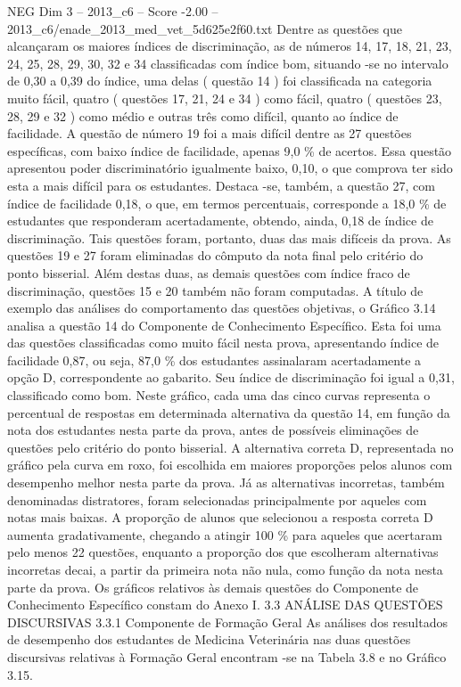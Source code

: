 \begin{textsample}{NEG Dim 3 – 2013\_c6 – Score -2.00 – 2013\_c6/enade\_2013\_med\_vet\_5d625e2f60.txt}
Dentre as questões que alcançaram os maiores índices de discriminação, as de números 14, 17, 18, 21, 23, 24, 25, 28, 29, 30, 32 e 34 classificadas com índice bom, situando -se no intervalo de 0,30 a 0,39 do índice, uma delas ( questão 14 ) foi classificada na categoria muito fácil, quatro ( questões 17, 21, 24 e 34 ) como fácil, quatro ( questões 23, 28, 29 e 32 ) como médio e outras três como difícil, quanto ao índice de facilidade.
A questão de número 19 foi a mais difícil dentre as 27 questões específicas, com baixo índice de facilidade, apenas 9,0 \% de acertos.
Essa questão apresentou poder discriminatório igualmente baixo, 0,10, o que comprova ter sido esta a mais difícil para os estudantes.
Destaca -se, também, a questão 27, com índice de facilidade 0,18, o que, em termos percentuais, corresponde a 18,0 \% de estudantes que responderam acertadamente, obtendo, ainda, 0,18 de índice de discriminação.
Tais questões foram, portanto, duas das mais difíceis da prova.
As questões 19 e 27 foram eliminadas do cômputo da nota final pelo critério do ponto bisserial.
Além destas duas, as demais questões com índice fraco de discriminação, questões 15 e 20 também não foram computadas.
A título de exemplo das análises do comportamento das questões objetivas, o Gráfico 3.14 analisa a questão 14 do Componente de Conhecimento Específico.
Esta foi uma das questões classificadas como muito fácil nesta prova, apresentando índice de facilidade 0,87, ou seja, 87,0 \% dos estudantes assinalaram acertadamente a opção D, correspondente ao gabarito.
Seu índice de discriminação foi igual a 0,31, classificado como bom.
Neste gráfico, cada uma das cinco curvas representa o percentual de respostas em determinada alternativa da questão 14, em função da nota dos estudantes nesta parte da prova, antes de possíveis eliminações de questões pelo critério do ponto bisserial.
A alternativa correta D, representada no gráfico pela curva em roxo, foi escolhida em maiores proporções pelos alunos com desempenho melhor nesta parte da prova.
Já as alternativas incorretas, também denominadas distratores, foram selecionadas principalmente por aqueles com notas mais baixas.
A proporção de alunos que selecionou a resposta correta D aumenta gradativamente, chegando a atingir 100 \% para aqueles que acertaram pelo menos 22 questões, enquanto a proporção dos que escolheram alternativas incorretas decai, a partir da primeira nota não nula, como função da nota nesta parte da prova.
Os gráficos relativos às demais questões do Componente de Conhecimento Específico constam do Anexo I. 3.3 ANÁLISE DAS QUESTÕES DISCURSIVAS 3.3.1 Componente de Formação Geral As análises dos resultados de desempenho dos estudantes de Medicina Veterinária nas duas questões discursivas relativas à Formação Geral encontram -se na Tabela 3.8 e no Gráfico 3.15.

\end{textsample}
